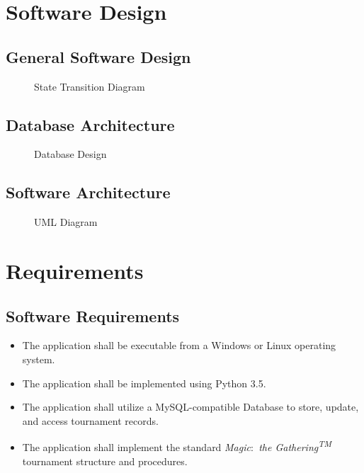 \documentclass[11pt]{article}
\newcommand{\mtg}{\textit{Magic$\colon$ the Gathering\textsuperscript{TM}} }
\begin{document}
    \newpage
    
    \section{Software Design}
    \subsection{General Software Design}
    \begin{figure}[H]
        \centering
        \caption{State Transition Diagram}
    \end{figure}
    \subsection{Database Architecture}
    \begin{figure}[H]
        \centering
        \caption{Database Design}
    \end{figure}
    \subsection{Software Architecture}
     \begin{figure}[H]
        \centering
        \caption{UML Diagram}
    \end{figure}
    
    \newpage
    
    \section{Requirements}
    \subsection{Software Requirements}
    \begin{itemize}
        \item The application shall be executable from a Windows or Linux operating system.
        \item The application shall be implemented using Python 3.5.
        \item The application shall utilize a MySQL-compatible Database to store, update, and access tournament records.
        \item The application shall implement the standard \mtg tournament structure and procedures.
    \end{itemize}
    
\end{document}
